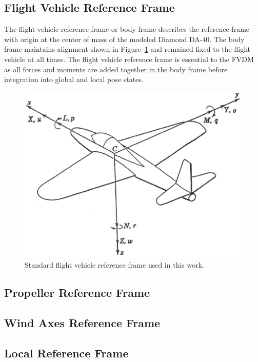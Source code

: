 \documentclass[12pt]{report}
\begin{document}
\subsection{Flight Vehicle Reference Frame}
The flight vehicle reference frame or body frame describes the reference frame with origin at the center of mass of the modeled Diamond DA-40. The body frame maintains alignment shown in Figure~\ref{fig:flightvehiclereferenceframe} and remained fixed to the flight vehicle at all times. The flight vehicle reference frame is essential to the FVDM as all forces and moments are added together in the body frame before integration into global and local pose states.

\begin{figure}[!ht]\label{fig:flightvehiclereferenceframe}
  \centering
  \includegraphics[width=0.85\linewidth]{Figures/bodyframe.png}
  \caption{Standard flight vehicle reference frame used in this work.~\cite{peetSpacecraftAircraftDynamics}}
\end{figure}

\subsection{Propeller Reference Frame}

\subsection{Wind Axes Reference Frame}

\subsection{Local Reference Frame}
\end{document}
